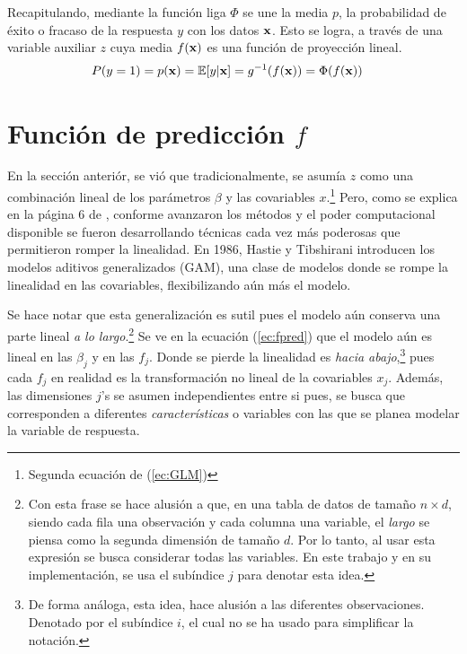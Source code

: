 \documentclass[../Main/Main.tex]{subfiles}
\begin{document}
Recapitulando, mediante la función liga $\Phi$ se une la media $p$, la probabilidad de éxito o fracaso de la respuesta $y$ con los datos $\mathbf{x}$. Esto se logra, a través de una variable auxiliar $z$ cuya media $f(\mathbf{x})$ es una función de proyección lineal. 
\begin{align} \label{ec:RegMedia}
	P(y = 1) = p(\mathbf{x}) &=\mathbb{E}[y|\mathbf{x}] = g^{-1}(f(\mathbf{x})) = \Phi(f(\mathbf{x}))
\end{align}

\section{Función de predicción $f$} \label{sec:FuncPred} 
En la sección anteriór, se vió que tradicionalmente, se asumía $z$ como una combinación lineal de los parámetros $\beta$ y las covariables $x$.\footnote{Segunda ecuación de (\ref{ec:GLM})} Pero, como se explica en la página 6 de \citet{james2013introduction}, conforme avanzaron los métodos y el poder computacional disponible se fueron desarrollando técnicas cada vez más poderosas que permitieron romper la linealidad. En 1986, Hastie y Tibshirani introducen los modelos aditivos generalizados (GAM), una clase de modelos donde se rompe la linealidad en las covariables, flexibilizando aún más el  modelo.

Se hace notar que esta generalización es sutil pues el modelo aún conserva una parte lineal \textit{a lo largo}.\footnote{Con esta frase se hace alusión a que, en una tabla de datos de tamaño $n \times d$, siendo cada fila una observación y cada columna una variable, el \textit{largo} se piensa como la segunda dimensión de tamaño $d$. Por lo tanto, al usar esta expresión se busca considerar todas las variables. En este trabajo y en su implementación, se usa el subíndice $j$ para denotar esta idea.} Se ve en la ecuación (\ref{ec:fpred}) que el modelo aún es lineal en las $\beta_j$ y en las $f_j$. Donde se pierde la linealidad es \textit{hacia abajo},\footnote{De forma análoga, esta idea, hace alusión a las diferentes observaciones. Denotado por el subíndice $i$, el cual no se ha usado para simplificar la notación.} pues cada $f_j$ en realidad es la transformación no lineal de la covariables $x_j$. Además, las dimensiones $j$'s se asumen independientes entre si pues, se busca que corresponden a diferentes \textit{características} o variables con las que se planea modelar la variable de respuesta.
\end{document}
